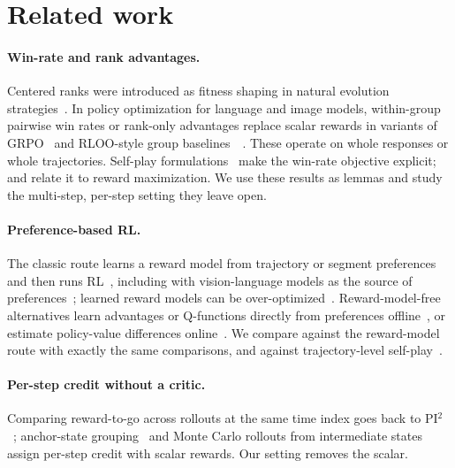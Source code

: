 \documentclass[11pt]{article}
\theoremstyle{remark}
\begin{document}
\section{Related work}
\label{sec:related}

\paragraph{Win-rate and rank advantages.}
Centered ranks were introduced as fitness shaping in natural evolution strategies~\citep{wierstra2014nes,salimans2017es}. In policy optimization for language and image models, within-group pairwise win rates or rank-only advantages replace scalar rewards in variants of GRPO~\citep{shao2024grpo} and RLOO-style group baselines~\citep{ahmadian2024rloo}~\citep{wang2025prefgrpo,choi2026gopo,zhang2026arenarl,yang2026tournament}. These operate on whole responses or whole trajectories. Self-play formulations~\citep{munos2023nash,wu2024sppo,swamy2024minimaximalist} make the win-rate objective explicit; \citet{dudik2015contextual} and \citet{zhang2025winrate} relate it to reward maximization. We use these results as lemmas and study the multi-step, per-step setting they leave open.

\paragraph{Preference-based RL.}
The classic route learns a reward model from trajectory or segment preferences and then runs RL~\citep{christiano2017deep,lee2021pebble}, including with vision-language models as the source of preferences~\citep{wang2024rlvlmf}; learned reward models can be over-optimized~\citep{gao2023overoptimization}. Reward-model-free alternatives learn advantages or Q-functions directly from preferences offline~\citep{knox2024advantage,hejna2024cpl,hejna2023ipl}, or estimate policy-value differences online~\citep{zhang2025zpg,assmus2026sp3o}. We compare against the reward-model route with exactly the same comparisons, and against trajectory-level self-play~\citep{swamy2024minimaximalist}.

\paragraph{Per-step credit without a critic.}
Comparing reward-to-go across rollouts at the same time index goes back to PI$^2$~\citep{theodorou2010pi2}; anchor-state grouping~\citep{feng2025gigpo} and Monte Carlo rollouts from intermediate states~\citep{kazemnejad2025vineppo} assign per-step credit with scalar rewards. Our setting removes the scalar.
\end{document}
